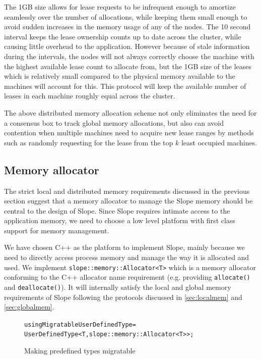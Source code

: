 The 1GB size allows for lease requests to be infrequent enough to amortize
seamlessly over the number of allocations, while keeping them small enough
to avoid sudden increases in the memory usage of any of the nodes. The 10
second interval keeps the lease ownership counts up to date across the cluster,
while causing little overhead to the application. However because of stale
information during the intervals, the nodes will not always
correctly choose the machine with the highest available lease count to allocate
from, but the 1GB size of the leases which is relatively small compared to the
physical memory available to the machines will account for this. This protocol 
will keep the available number of leases in each machine roughly equal across
the cluster.

The above distributed memory allocation scheme not only eliminates the need for
a consensus box to track global memory allocations, but also can avoid
contention when multiple machines need to acquire new lease ranges by methods
such as randomly requesting for the lease from the top $k$ least occupied
machines.

\subsection{Memory allocator}
\label{sec:platform}
The strict local and distributed memory requirements discussed in the previous
section suggest that a memory allocator to manage the Slope memory should be central
to the design of Slope. Since Slope requires intimate access to the application
memory, we need to choose a low level platform with first class support for
memory management.

We have chosen C++ as the platform to implement Slope, mainly because we need
to directly access process memory and manage the way it is allocated and used.
We implement \texttt{slope::memory::Allocator<T>} which is a memory allocator
conforming to the C++ allocator name requirement (e.g. providing
\texttt{allocate()} and \texttt{deallocate()}). It will internally satisfy the
local and global memory requirements of Slope following the protocols discussed
in \autoref{sec:localmem} and \autoref{sec:globalmem}.

\begin{figure}[t]
\begin{alltt}
using MigratableUserDefinedType =
    UserDefinedType<T, slope::memory::Allocator<T>>;
\end{alltt}
\caption{
    Making predefined types migratable
}
\label{fig:migratableuserdefined}
\end{figure}

